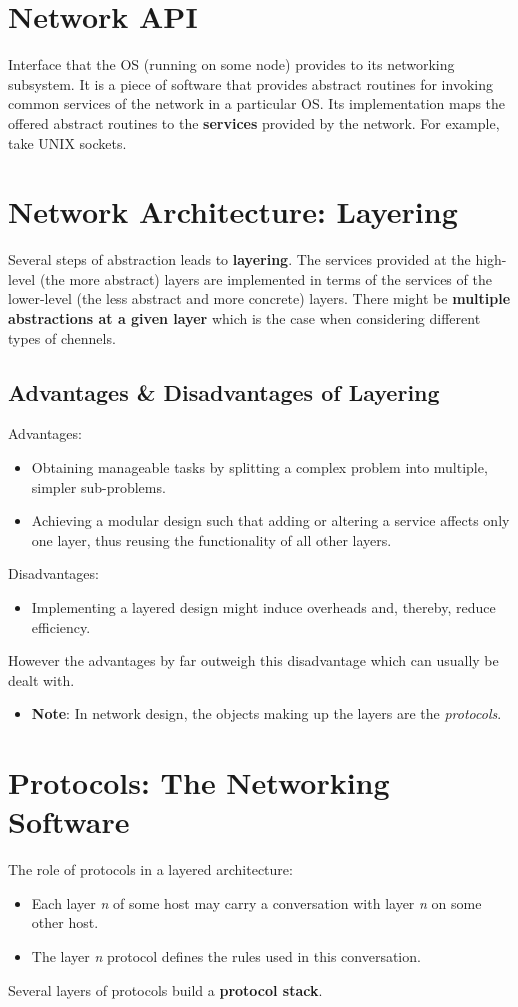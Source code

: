 \documentclass[11pt]{article}
\begin{document}
\section{Network API}
\label{sec:org3b1104b}
Interface that the OS (running on some node) provides to its networking subsystem.
It is a piece of software that provides abstract routines for invoking common services of the network in a particular OS.
Its implementation maps the offered abstract routines to the \textbf{services} provided by the network.
For example, take UNIX sockets.

\section{Network Architecture: Layering}
\label{sec:org7e37983}
Several steps of abstraction leads to \textbf{layering}.
The services provided at the high-level (the more abstract) layers are implemented in terms of the services of the lower-level (the less abstract and more concrete) layers.
There might be \textbf{multiple abstractions at a given layer} which is the case when considering different types of chennels.

\subsection{Advantages \& Disadvantages of Layering}
\label{sec:org049ee96}
Advantages:
\begin{itemize}
\item Obtaining manageable tasks by splitting a complex problem into multiple, simpler sub-problems.
\item Achieving a modular design such that adding or altering a service affects only one layer, thus reusing the functionality of all other layers.
\end{itemize}
Disadvantages:
\begin{itemize}
\item Implementing a layered design might induce overheads and, thereby, reduce efficiency.
\end{itemize}
However the advantages by far outweigh this disadvantage which can usually be dealt with.
\begin{itemize}
\item \textbf{Note}: In network design, the objects making up the layers are the \emph{protocols}.
\end{itemize}

\section{Protocols: The Networking Software}
\label{sec:orgcbf23a8}
The role of protocols in a layered architecture:
\begin{itemize}
\item Each layer \emph{n} of some host may carry a conversation with layer \emph{n} on some other host.
\item The layer \emph{n} protocol defines the rules used in this conversation.
\end{itemize}
Several layers of protocols build a \textbf{protocol stack}.
\end{document}
